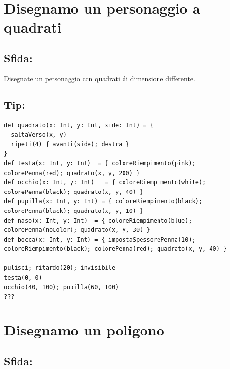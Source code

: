 \chapter{Disegnamo un personaggio a quadrati}\section*{\color{BrickRed}Sfida:}
Disegnate un personaggio con quadrati di dimensione differente.
\\


  
\section*{\color{OliveGreen}Tip:}

\begin{lstlisting}[basicstyle={\ttfamily\fontsize{14}{17}\selectfont},numbers=none]
def quadrato(x: Int, y: Int, side: Int) = {
  saltaVerso(x, y)
  ripeti(4) { avanti(side); destra }
}
def testa(x: Int, y: Int)  = { coloreRiempimento(pink); colorePenna(red); quadrato(x, y, 200) }
def occhio(x: Int, y: Int)   = { coloreRiempimento(white); colorePenna(black); quadrato(x, y, 40) }
def pupilla(x: Int, y: Int) = { coloreRiempimento(black); colorePenna(black); quadrato(x, y, 10) }
def naso(x: Int, y: Int)  = { coloreRiempimento(blue); colorePenna(noColor); quadrato(x, y, 30) }
def bocca(x: Int, y: Int) = { impostaSpessorePenna(10); coloreRiempimento(black); colorePenna(red); quadrato(x, y, 40) }

pulisci; ritardo(20); invisibile
testa(0, 0)
occhio(40, 100); pupilla(60, 100)
???
\end{lstlisting}
        
\chapter{Disegnamo un poligono}\section*{\color{BrickRed}Sfida:}


